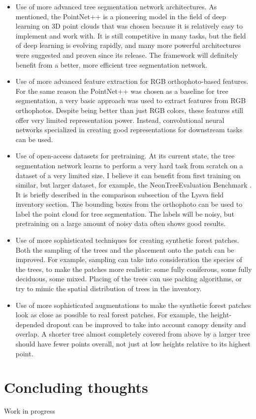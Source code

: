 \begin{itemize}
\item Use of more advanced tree segmentation network architectures.
  As mentioned, the PointNet++ is a pioneering model in the field of deep learning on 3D point clouds that was chosen because it is relatively easy to implement and work with.
  It is still competitive in many tasks, but the field of deep learning is evolving rapidly, and many more powerful architectures were suggested and proven since its release.
  The framework will definitely benefit from a better, more efficient tree segmentation network.
\item Use of more advanced feature extraction for RGB orthophoto-based features.
  For the same reason the PointNet++ was chosen as a baseline for tree segmentation, a very basic approach was used to extract features from RGB orthophotos.
  Despite being better than just RGB colors, these features still offer very limited representation power.
  Instead, convolutional neural networks specialized in creating good representations for downstream tasks can be used.
\item Use of open-access datasets for pretraining.
  At its current state, the tree segmentation network learns to perform a very hard task from scratch on a dataset of a very limited size.
  I believe it can benefit from first training on similar, but larger dataset, for example, the NeonTreeEvaluation Benchmark \citep{weinsteinDataNeonTreeEvaluationBenchmark2022}.
  It is briefly described in the comparison subsection of the Lysva field inventory section.
  The bounding boxes from the orthophoto can be used to label the point cloud for tree segmentation.
  The labels will be noisy, but pretraining on a large amount of noisy data often shows good results.
\item Use of more sophisticated techniques for creating synthetic forest patches.
  Both the sampling of the trees and the placement onto the patch can be improved.
  For example, sampling can take into consideration the species of the trees, to make the patches more realistic: some fully coniferous, some fully deciduous, some mixed.
  Placing of the trees can use packing algorithms, or try to mimic the spatial distribution of trees in the inventory.
\item Use of more sophisticated augmentations to make the synthetic forest patches look as close as possible to real forest patches.
  For example, the height-depended dropout can be improved to take into account canopy density and overlap.
  A shorter tree almost completely covered from above by a larger tree should have fewer points overall, not just at low heights relative to its highest point.
\end{itemize}

\section{Concluding thoughts}

Work in progress
